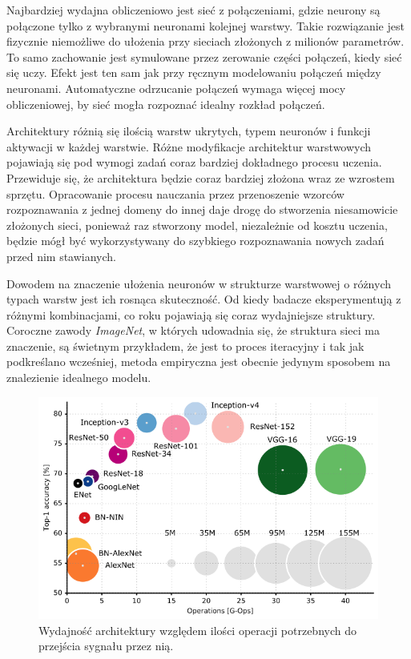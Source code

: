 \documentclass[12pt,a4paper,twoside,titlepage,openright]{book}
\begin{document}
\begin{itemize}
Najbardziej wydajna obliczeniowo jest sieć z połączeniami, gdzie neurony są połączone tylko z wybranymi neuronami kolejnej warstwy. Takie rozwiązanie jest fizycznie niemożliwe do ułożenia przy sieciach złożonych z milionów parametrów. To samo zachowanie jest symulowane przez zerowanie części połączeń, kiedy sieć się uczy. Efekt jest ten sam jak przy ręcznym modelowaniu połączeń między neuronami. Automatyczne odrzucanie połączeń wymaga więcej mocy obliczeniowej, by sieć mogła rozpoznać idealny rozkład połączeń.

Architektury różnią się ilością warstw ukrytych, typem neuronów i funkcji aktywacji w każdej warstwie.
Różne modyfikacje architektur warstwowych pojawiają się pod wymogi zadań coraz bardziej dokładnego procesu uczenia. Przewiduje się, że architektura będzie coraz bardziej złożona wraz ze wzrostem sprzętu. Opracowanie procesu nauczania przez przenoszenie wzorców rozpoznawania z jednej domeny do innej daje drogę do stworzenia niesamowicie złożonych sieci, ponieważ raz stworzony model, niezależnie od kosztu uczenia, będzie mógł być wykorzystywany do szybkiego rozpoznawania nowych zadań przed nim stawianych.

Dowodem na znaczenie ułożenia neuronów w strukturze warstwowej o różnych typach warstw jest ich rosnąca skuteczność. Od kiedy badacze eksperymentują z różnymi kombinacjami, co roku pojawiają się coraz wydajniejsze struktury. Coroczne zawody \textit{ImageNet}, w których udowadnia się, że struktura sieci ma znaczenie, są świetnym przykładem, że jest to proces iteracyjny i tak jak podkreślano wcześniej, metoda empiryczna jest obecnie jedynym sposobem na znalezienie idealnego modelu.

\begin{figure}[h]
	\centering
			\includegraphics[resolution=100, scale=0.6]{architecturePerformance.png}
		\caption{Wydajność architektury względem ilości operacji potrzebnych do przejścia sygnału przez nią.}
\end{figure}



\end{itemize}
\end{document}
